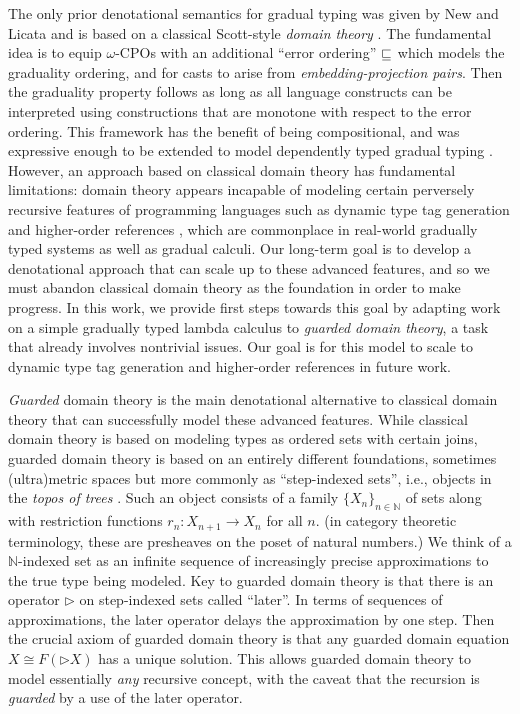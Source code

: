 The only prior denotational semantics for gradual typing was given by
New and Licata and is based on a classical Scott-style \emph{domain
theory} \cite{new-licata18}. The fundamental idea is to equip
$\omega$-CPOs with an additional ``error ordering'' $\sqsubseteq$ which
models the graduality ordering, and for casts to arise from
\emph{embedding-projection pairs}. Then the graduality property
follows as long as all language constructs can be interpreted using
constructions that are monotone with respect to the error ordering.
%
This framework has the benefit of being compositional, and was
expressive enough to be extended to model dependently typed gradual
typing \cite{gradualizing-cic}.
%
However, an approach based on classical domain theory has fundamental
limitations: domain theory appears incapable of modeling certain perversely
recursive features of programming languages such as dynamic type tag
generation and higher-order references \cite{Birkedal-Stovring-Thamsborg-2009}, which are commonplace in
real-world gradually typed systems as well as gradual calculi.
%
Our long-term goal is to develop a denotational approach that can
scale up to these advanced features, and so we must abandon classical
domain theory as the foundation in order to make progress. In this
work, we provide first steps towards this goal by adapting work on a
simple gradually typed lambda calculus to \emph{guarded domain
theory}, a task that already involves nontrivial issues.
Our goal is for this model to scale to dynamic type tag
generation and higher-order references in future work.

\emph{Guarded} domain theory is the main denotational alternative to
classical domain theory that can successfully model these advanced
features. While classical domain theory is based on modeling types as
ordered sets with certain joins, guarded domain theory is based on an
entirely different foundations, sometimes (ultra)metric spaces but
more commonly as ``step-indexed sets'', i.e., objects in the
\emph{topos of trees}
\cite{birkedal-mogelberg-schwinghammer-stovring2011}.  Such an object
consists of a family $\{X_n\}_{n \in \mathbb{N}}$ of sets along with
restriction functions $r_n : X_{n+1} \to X_n$ for all $n$.  (in
category theoretic terminology, these are presheaves on the poset of
natural numbers.)  We think of a $\mathbb{N}$-indexed set as an
infinite sequence of increasingly precise approximations to the true
type being modeled.
%
Key to guarded domain theory is that there is an operator
$\triangleright$ on step-indexed sets called ``later''. In terms of
sequences of approximations, the later operator delays the
approximation by one step. Then the crucial axiom of guarded domain
theory is that any guarded domain equation $X \cong F(\triangleright
X)$ has a unique solution. This allows guarded domain theory to model
essentially \emph{any} recursive concept, with the caveat that the
recursion is \emph{guarded} by a use of the later operator.

